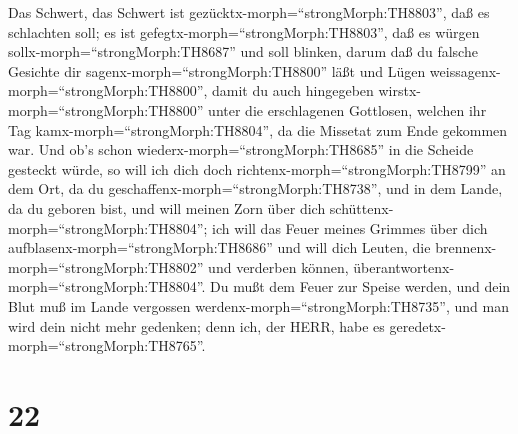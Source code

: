 Das Schwert, das Schwert ist gezücktx-morph=``strongMorph:TH8803'', daß
es schlachten soll; es ist gefegtx-morph=``strongMorph:TH8803'', daß es
würgen sollx-morph=``strongMorph:TH8687'' und soll blinken,
 darum daß du falsche Gesichte dir
sagenx-morph=``strongMorph:TH8800'' läßt und Lügen
weissagenx-morph=``strongMorph:TH8800'', damit du auch hingegeben
wirstx-morph=``strongMorph:TH8800'' unter die erschlagenen Gottlosen,
welchen ihr Tag kamx-morph=``strongMorph:TH8804'', da die Missetat zum
Ende gekommen war.  Und ob's schon
wiederx-morph=``strongMorph:TH8685'' in die Scheide gesteckt würde, so
will ich dich doch richtenx-morph=``strongMorph:TH8799'' an dem Ort, da
du geschaffenx-morph=``strongMorph:TH8738'', und in dem Lande, da du
geboren bist,  und will meinen Zorn über dich
schüttenx-morph=``strongMorph:TH8804''; ich will das Feuer meines
Grimmes über dich aufblasenx-morph=``strongMorph:TH8686'' und will dich
Leuten, die brennenx-morph=``strongMorph:TH8802'' und verderben können,
überantwortenx-morph=``strongMorph:TH8804''.  Du mußt dem
Feuer zur Speise werden, und dein Blut muß im Lande vergossen
werdenx-morph=``strongMorph:TH8735'', und man wird dein nicht mehr
gedenken; denn ich, der HERR, habe es
geredetx-morph=``strongMorph:TH8765''.

\hypertarget{section-21}{%
\section{22}\label{section-21}}

